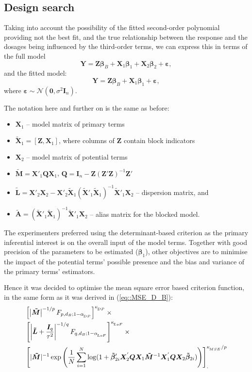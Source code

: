 \subsection{Design search}

Taking into account the possibility of the fitted second-order polynomial providing not the best fit, and the true relationship between the response and the dosages being influenced by the third-order terms, we can express this in terms of the full model
\begin{equation*}
\bm{Y}=\bm{Z\beta}_{B}+\bm{X}_{1}\bm{\beta}_{1}+\bm{X}_{2}\bm{\beta}_{2}+\bm{\varepsilon},
\end{equation*}
and the fitted model: 
\begin{equation*}
\bm{Y}=\bm{Z\beta}_{B}+\bm{X}_{1}\bm{\beta}_{1}+\bm{\varepsilon},
\end{equation*}
where $\bm{\varepsilon}\sim \mathcal{N}(\bm{0},\sigma^{2}\bm{I}_{n}).$

The notation here and further on is the same as before:
\begin{itemize}
\item $\bm{X}_{1}$ -- model matrix of primary terms
\item $\bm{\tilde{X}}_{1}=[\bm{Z},\bm{X}_{1}]$, where columns of $\bm{Z}$ contain block indicators
\item $\bm{X}_{2}$ -- model matrix of potential terms
\item $\bm{\tilde{M}}=\bm{X}'_{1}\bm{Q}\bm{X}_{1}$, $\bm{Q}= \bm{I}_{n}-\bm{Z}(\bm{Z}'\bm{Z})^{-1}\bm{Z}'$
\item $\bm{\tilde{L}}=\bm{X}'_{2}\bm{X}_{2}-\bm{X}'_{2}\bm{\tilde{X}}_{1}(\bm{\tilde{X}}'_{1}\bm{\tilde{X}}_{1})^{-1}\bm{\tilde{X}}'_{1}\bm{X}_{2}$ -- dispersion matrix, and 
\item $\bm{\tilde{A}}= (\bm{\tilde{X}}'_{1}\bm{\tilde{X}}_{1})^{-1}\bm{\tilde{X}}'_{1}\bm{X}_{2}$ -- alias matrix for the blocked model.
\end{itemize}

The experimenters preferred using the determinant-based criterion as the primary inferential interest is on the overall input of the model terms. Together with good precision of the parameters to be estimated ($\bm{\beta}_1$), other objectives are to minimise the impact of the potential terms' possible presence and the bias and variance of the primary terms' estimators.
 
Hence it was decided to optimise the mean square error based criterion function, in the same form as it was derived in (\ref{eq::MSE_D_B}):
\begin{align}
\label{eq::crit1}
&\left[\left|\bm{\tilde{M}}\right|^{-1/p}F_{p,d_B;1-\alpha_{\!_{DP}}}\right]^{\kappa_{\!_{DP}}} \times \notag \\ &\left[\left|\bm{\tilde{L}}+\frac{\bm{I}_{q}}{\tau^{2}}\right|^{-1/q}F_{q,d_B;1-\alpha_{\!_{LoF}}}\right]^{\kappa_{\!_{LoF}}}\times \notag\\ & \left[|\bm{\tilde{M}}|^{-1}\exp\left(\frac{1}{N}\sum_{i=1}^{N}\log(1+\bm{\tilde{\beta}}_{2i}'\bm{X}_2^{'}\bm{Q}\bm{X}_1\bm{\tilde{M}}^{-1}\bm{X}_1^{'}\bm{Q}\bm{X}_2\bm{\tilde{\beta}}_{2i})\right)\right]_{.}^{\kappa_{\!_{MSE}}/p}
\end{align}

